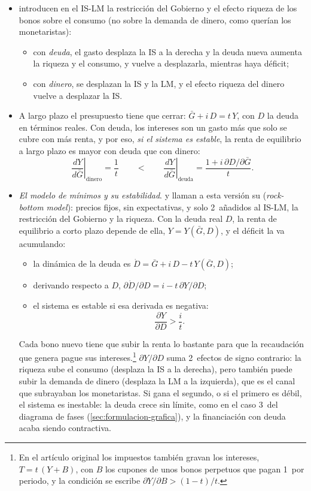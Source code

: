 \documentclass[11pt]{article}
\begin{document}
\begin{itemize}
\item \textcite{BlinderSolow1973Analytical} introducen en el IS-LM la restricción del Gobierno y el efecto riqueza de los bonos sobre el consumo (no sobre la demanda de dinero, como querían los monetaristas):
  \begin{itemize}
  \item con \emph{deuda}, el gasto desplaza la IS a la derecha y la deuda nueva aumenta la riqueza y el consumo, y vuelve a desplazarla, mientras haya déficit;
  \item con \emph{dinero}, se desplazan la IS y la LM, y el efecto riqueza del dinero vuelve a desplazar la IS.
  \end{itemize}
\item A largo plazo el presupuesto tiene que cerrar: $\bar G+i\,D=t\,Y$, con $D$ la deuda en términos reales. Con deuda, los intereses son un gasto más que solo se cubre con más renta, y por eso, \emph{si el sistema es estable}, la renta de equilibrio a largo plazo es mayor con deuda que con dinero:
  \begin{equation*}
  \left.\frac{dY}{d\bar G}\right|_{\text{dinero}}=\frac{1}{t}\qquad<\qquad\left.\frac{dY}{d\bar G}\right|_{\text{deuda}}=\frac{1+i\,\partial D/\partial\bar G}{t}.
  \end{equation*}
\item \emph{El modelo de mínimos y su estabilidad}.  y  llaman a esta versión su  (\emph{rock-bottom model}): precios fijos, sin expectativas, y solo 2~añadidos al IS-LM, la restricción del Gobierno y la riqueza. Con la deuda real $D$, la renta de equilibrio a corto plazo depende de ella, $Y=Y(\bar G,D)$, y el déficit la va acumulando:
  \begin{itemize}
  \item la dinámica de la deuda es $\dot D=\bar G+i\,D-t\,Y(\bar G,D)$;
  \item derivando respecto a $D$, $\partial\dot D/\partial D=i-t\,\partial Y/\partial D$;
  \item el sistema es estable si esa derivada es negativa:
    \begin{equation*}
    \frac{\partial Y}{\partial D}>\frac{i}{t}.
    \end{equation*}
  \end{itemize}
  Cada bono nuevo tiene que subir la renta lo bastante para que la recaudación que genera pague sus intereses.\footnote{En el artículo original los impuestos también gravan los intereses, $T=t\,(Y+B)$, con $B$ los cupones de unos bonos perpetuos que pagan 1~por periodo, y la condición se escribe $\partial Y/\partial B>(1-t)/t$\nocite{BlinderSolow1973Analytical}.} $\partial Y/\partial D$ suma 2~efectos de signo contrario: la riqueza sube el consumo (desplaza la IS a la derecha), pero también puede subir la demanda de dinero (desplaza la LM a la izquierda), que es el canal que subrayaban los monetaristas. Si gana el segundo, o si el primero es débil, el sistema es inestable: la deuda crece sin límite, como en el caso 3~del diagrama de fases (\ref{sec:formulacion-grafica}), y la financiación con deuda acaba siendo contractiva.

\end{itemize}
\end{document}
